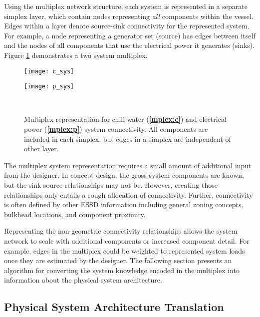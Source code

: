 \documentclass[preprint,12pt]{elsarticle}
\begin{document}
Using the multiplex network structure, each system is represented in a separate simplex layer, which contain nodes representing \textit{all} components within the vessel. Edges within a layer denote source-sink connectivity for the represented system. For example, a node representing a generator set (source) has edges between itself and the nodes of all components that use the electrical power it generates (sinks). Figure \ref{fig:mplex} demonstrates a two system multiplex.

\begin{figure}
	\begin{minipage}{.45\linewidth}
		\centering
		\texttt{[image: c\_sys]}
		\label{mplex:c}
	\end{minipage}
	\begin{minipage}{.45\linewidth}
		\centering
		\texttt{[image: p\_sys]}
		\label{mplex:p}
	\end{minipage}\\[1ex]
	\caption{Multiplex representation for chill water (\textbf{\ref{mplex:c}}) and electrical power (\textbf{\ref{mplex:p}}) system connectivity. All components are included in each simplex, but edges in a simplex are independent of other layer. }
	\label{fig:mplex}
\end{figure}



The multiplex system representation requires a small amount of additional input from the designer. In concept design, the gross system components are known, but the sink-source relationships may not be. However, creating those relationships only entails a rough allocation of connectivity. Further, connectivity is often defined by other ESSD information including general zoning concepts, bulkhead locations, and component proximity. 

Representing the non-geometric connectivity relationships allows the system network to scale with additional components or increased component detail. For example, edges in the multiplex could be weighted to represented system loads once they are estimated by the designer. The following section presents an algorithm for converting the system knowledge encoded in the multiplex into information about the physical system architecture.




\subsection{Physical System Architecture Translation} \label{sec:algorithm}
\end{document}
